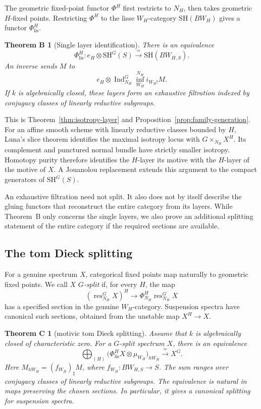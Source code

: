 \documentclass[11pt,reqno]{amsart}
\theoremstyle{definition}
\theoremstyle{remark}
\theoremstyle{plain}
\newtheorem*{layertheorem}{Theorem B}
\newtheorem*{splittingtheorem}{Theorem C}
\numberwithin{equation}{section}
\newcommand{\SH}{\mathrm{SH}}
\newcommand{\lis}{\mathrm{lis}}
\begin{document}
The geometric fixed-point functor \(\Phi^H\) first restricts to \(N_H\), then
takes geometric \(H\)-fixed points. Restricting \(\Phi^H\) to the
lisse \(W_H\)-category \(\SH(BW_H)\) gives a functor \(\Phi_{\lis}^H\).

\begin{layertheorem}[Single layer identification]
There is an equivalence
\[
 \Phi_{\lis}^H:e_H\otimes\SH^G(S)
             \xrightarrow{\ \simeq\ }\SH(BW_{H,S}).
\]
An inverse sends \(M\) to
\[
 e_H\otimes\operatorname{Ind}_{N_H}^G
       \operatorname{inf}_{W_H}^{N_H}i_{W_H!}M.
\]
If \(k\) is algebraically closed, these layers form an exhaustive
filtration indexed by conjugacy classes of linearly reductive subgroups.
\end{layertheorem}

This is Theorem~\ref{thm:isotropy-layer} and
Proposition~\ref{prop:family-generation}.
For an affine smooth scheme with linearly reductive classes bounded by \(H\),
Luna's slice theorem identifies the maximal isotropy locus with
\(G\times_{N_H}X^H\).
Its complement and punctured normal bundle have strictly smaller isotropy.
Homotopy purity therefore identifies the \(H\)-layer its motive with the \(H\)-layer
of the motive of \(X\).
A Jouanolou replacement extends this argument to the compact generators
of \(\SH^G(S)\).

An exhaustive filtration need not split.
It also does not by itself describe the gluing functors that reconstruct
the entire category from its layers.
While Theorem~B only concerns the single layers,
we also prove an additional splitting statement of the entire category if the required
sections are available.

\subsection{The tom Dieck splitting}

For a genuine spectrum \(X\), categorical fixed points map naturally to
geometric fixed points.
We call \(X\) \emph{\(G\)-split} if, for every \(H\), the map
\[
 (\operatorname{res}_{N_H}^G X)^H
       \longrightarrow \Phi_{N_H}^H\operatorname{res}_{N_H}^G X
\]
has a specified section in the genuine \(W_H\)-category.
Suspension spectra have canonical such sections, obtained from the
unstable map \(X^H \to X\).

\begin{splittingtheorem}[motivic tom Dieck splitting]
Assume that \(k\) is algebraically closed of characteristic zero.
For a \(G\)-split spectrum \(X\), there is an equivalence
\[
 \bigoplus_{(H)}
 \bigl(\Phi_{\lis}^H X\otimes\mu_{W_H}\bigr)_{hW_H}
       \xrightarrow{\ \simeq\ } X^G.
\]
Here \(M_{hW_H}=(f_{W_H})_\sharp M\), where
\(f_{W_H}:BW_{H,S}\to S\).
The sum ranges over conjugacy classes of linearly reductive subgroups.
The equivalence is natural in maps preserving the chosen sections.
In particular, it gives a canonical splitting for suspension spectra.
\end{splittingtheorem}
\end{document}
